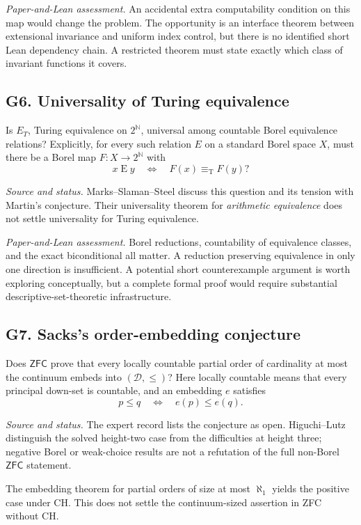 \documentclass[11pt,a4paper]{article}
\newcommand{\N}{\mathbb N}
\newcommand{\D}{\mathcal D}
\newcommand{\Cantor}{2^{\N}}
\newcommand{\eqT}{\equiv_{\mathrm T}}
\newcommand{\status}[1]{\par\noindent\textit{Source and status.} #1\par}
\newcommand{\assessment}[1]{\par\noindent\textit{Paper-and-Lean assessment.} #1\par}
\theoremstyle{definition}\newtheorem{definition}[theorem]{Definition}
\theoremstyle{remark}\newtheorem{remark}[theorem]{Remark}
\begin{document}
\assessment{An accidental extra computability condition on this map would change the problem. The opportunity is an interface theorem between extensional invariance and uniform index control, but there is no identified short Lean dependency chain. A restricted theorem must state exactly which class of invariant functions it covers.}

\subsection{G6. Universality of Turing equivalence \Lmark}
\label{entry:G6}

Is $E_T$, Turing equivalence on $\Cantor$, universal among countable Borel equivalence relations? Explicitly, for every such relation $E$ on a standard Borel space $X$, must there be a Borel map $F:X\to\Cantor$ with
\[
 x\mathrel E y\quad\Longleftrightarrow\quad F(x)\eqT F(y)?
\]
\status{Marks--Slaman--Steel discuss this question and its tension with Martin's conjecture. Their universality theorem for \emph{arithmetic equivalence} does not settle universality for Turing equivalence.\cite{MSS}}

\assessment{Borel reductions, countability of equivalence classes, and the exact biconditional all matter. A reduction preserving equivalence in only one direction is insufficient. A potential short counterexample argument is worth exploring conceptually, but a complete formal proof would require substantial descriptive-set-theoretic infrastructure.}

\subsection{G7. Sacks's order-embedding conjecture \Lmark}
\label{entry:G7}

Does $\mathsf{ZFC}$ prove that every locally countable partial order of cardinality at most the continuum embeds into $(\D,\leq)$? Here locally countable means that every principal down-set is countable, and an embedding $e$ satisfies
\[
 p\leq q\quad\Longleftrightarrow\quad e(p)\leq e(q).
\]
\status{The expert record lists the conjecture as open. Higuchi--Lutz distinguish the solved height-two case from the difficulties at height three; negative Borel or weak-choice results are not a refutation of the full non-Borel $\mathsf{ZFC}$ statement.\cite{HL,OLPSacks}}

The embedding theorem for partial orders of size at most $\aleph_1$ yields the positive case under CH. This does not settle the continuum-sized assertion in ZFC without CH.\cite{Shore,HL}
\end{document}
